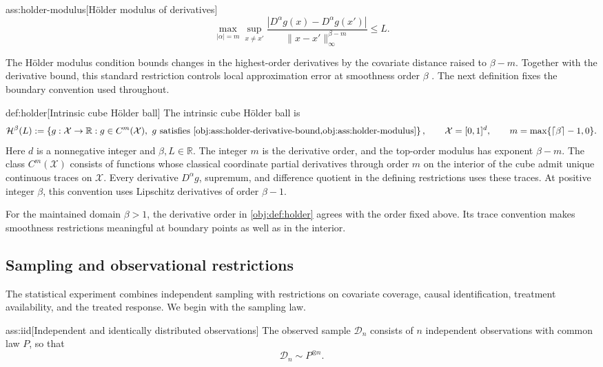 \begin{assumptionv}{ass:holder-modulus}[Hölder modulus of derivatives]
\[
\max_{|\alpha|=m}\sup_{x\ne x'}
\frac{|D^\alpha g(x)-D^\alpha g(x')|}
{\|x-x'\|_\infty^{\beta-m}}
\le L.
\]
\end{assumptionv}

The Hölder modulus condition bounds changes in the highest-order derivatives by the covariate distance raised to \(\beta-m\). Together with the derivative bound, this standard restriction controls local approximation error at smoothness order \(\beta\) \citep{Dorn2026GlobalOverlap}. The next definition fixes the boundary convention used throughout.

\begin{definitionv}{def:holder}[Intrinsic cube Hölder ball]
The intrinsic cube Hölder ball is
\[
\mathcal H^\beta(L)
:=
\left\{
g:\mathcal X\to\mathbb R:
g\in C^m(\mathcal X),\
g\text{ satisfies }\cref{obj:ass:holder-derivative-bound,obj:ass:holder-modulus}
\right\},
\qquad
\mathcal X=[0,1]^d,
\qquad
m=\max\{\lceil\beta\rceil-1,0\}.
\]
Here \(d\) is a nonnegative integer and \(\beta,L\in\mathbb R\). The integer \(m\) is the derivative order, and the top-order modulus has exponent \(\beta-m\). The class \(C^m(\mathcal X)\) consists of functions whose classical coordinate partial derivatives through order \(m\) on the interior of the cube admit unique continuous traces on \(\mathcal X\). Every derivative \(D^\alpha g\), supremum, and difference quotient in the defining restrictions uses these traces. At positive integer \(\beta\), this convention uses Lipschitz derivatives of order \(\beta-1\).
\end{definitionv}

For the maintained domain \(\beta>1\), the derivative order in \cref{obj:def:holder} agrees with the order fixed above. Its trace convention makes smoothness restrictions meaningful at boundary points as well as in the interior.

\subsection{Sampling and observational restrictions}

The statistical experiment combines independent sampling with restrictions on covariate coverage, causal identification, treatment availability, and the treated response. We begin with the sampling law.

\begin{assumptionv}{ass:iid}[Independent and identically distributed observations]
The observed sample \(\mathcal D_n\) consists of \(n\) independent observations with common law \(P\), so that
\[
\mathcal D_n\sim P^{\otimes n}.
\]
\end{assumptionv}

